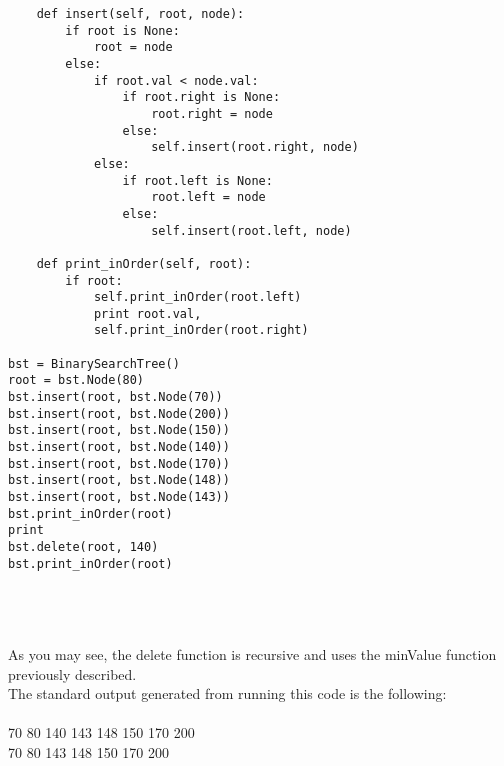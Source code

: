 \documentclass[11pt]{article}
\begin{document}
\begin{enumerate}
\begin{enumerate}
\begin{verbatim}
    def insert(self, root, node):
        if root is None:
            root = node
        else:
            if root.val < node.val:
                if root.right is None:
                    root.right = node
                else:
                    self.insert(root.right, node)
            else:
                if root.left is None:
                    root.left = node
                else:
                    self.insert(root.left, node)
                    
    def print_inOrder(self, root):
        if root:
            self.print_inOrder(root.left)
            print root.val,
            self.print_inOrder(root.right)
            
bst = BinarySearchTree()
root = bst.Node(80)
bst.insert(root, bst.Node(70))
bst.insert(root, bst.Node(200))
bst.insert(root, bst.Node(150))
bst.insert(root, bst.Node(140))
bst.insert(root, bst.Node(170))
bst.insert(root, bst.Node(148))
bst.insert(root, bst.Node(143))
bst.print_inOrder(root)
print
bst.delete(root, 140)
bst.print_inOrder(root)
        \end{verbatim}
        \\\\\\ As you may see, the delete function is recursive and uses the minValue function previously described.
        \\ The standard output generated from running this code is the following:
        \\\\ 70 80 140 143 148 150 170 200
        \\ 70 80 143 148 150 170 200
    \end{enumerate}
    

\end{enumerate}
\end{document}
